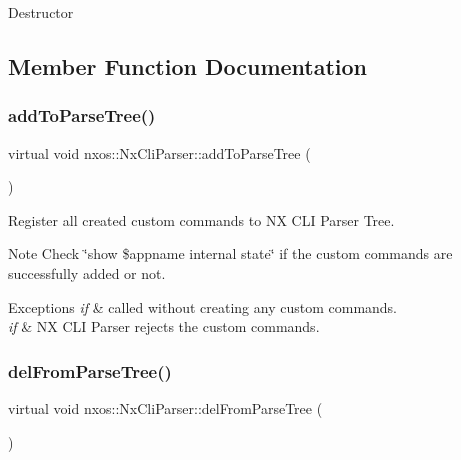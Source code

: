 Destructor 

\subsection{Member Function Documentation}
\mbox{\label{classnxos_1_1_nx_cli_parser_a3c5295a4b2de3068d1653a6c303a22ee}} 
\subsubsection{\texorpdfstring{add\+To\+Parse\+Tree()}{addToParseTree()}}
{\footnotesize\ttfamily virtual void nxos\+::\+Nx\+Cli\+Parser\+::add\+To\+Parse\+Tree (\begin{DoxyParamCaption}{ }\end{DoxyParamCaption})\hspace{0.3cm}{\ttfamily [pure virtual]}}

Register all created custom commands to NX C\+LI Parser Tree. \begin{DoxyNote}{Note}
Check \char`\"{}show \$appname internal state\char`\"{} if the custom commands are successfully added or not. 
\end{DoxyNote}

\begin{DoxyExceptions}{Exceptions}
{\em if} & called without creating any custom commands. \\
\hline
{\em if} & NX C\+LI Parser rejects the custom commands. \\
\hline
\end{DoxyExceptions}
\mbox{\label{classnxos_1_1_nx_cli_parser_a169976099ecf7a05277bfc72259ff1bc}} 
\subsubsection{\texorpdfstring{del\+From\+Parse\+Tree()}{delFromParseTree()}}
{\footnotesize\ttfamily virtual void nxos\+::\+Nx\+Cli\+Parser\+::del\+From\+Parse\+Tree (\begin{DoxyParamCaption}{ }\end{DoxyParamCaption})\hspace{0.3cm}{\ttfamily [pure virtual]}}

